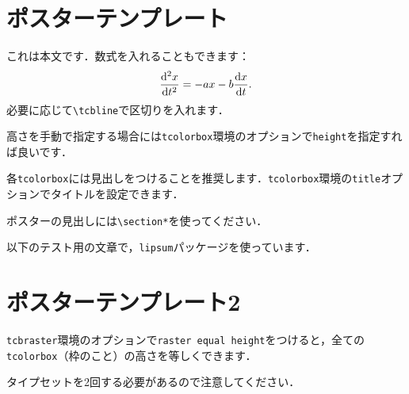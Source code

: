 \documentclass[12pt, a4j, dvipdfmx, jis2004]{jsarticle}
\begin{document}
\sffamily\gtfamily
\newpage
\section*{ポスターテンプレート}
\begin{tcbraster}[raster columns = 1]
	\begin{tcolorbox}[title = 本文・\texttt{\textbackslash tcbline}]
	これは本文です．数式を入れることもできます：
		\begin{equation}
		\dv[2]{x}{t}
		=-ax-b\dv{x}{t}.
		\end{equation}
	\tcbline
	必要に応じて\texttt{\textbackslash tcbline}で区切りを入れます．
	\end{tcolorbox}
	\begin{tcolorbox}[title = 高さ , height = 30mm]
	高さを手動で指定する場合には\texttt{tcolorbox}環境のオプションで\texttt{height}を指定すれば良いです．
	\end{tcolorbox}
	\begin{tcolorbox}[title = タイトルの指定]
	各\texttt{tcolorbox}には見出しをつけることを推奨します．\texttt{tcolorbox}環境の\texttt{title}オプションでタイトルを設定できます．
	\end{tcolorbox}
	\begin{tcolorbox}[title = ポスター見出し]
	ポスターの見出しには\texttt{\textbackslash section*}を使ってください．
	\end{tcolorbox}
	\begin{tcolorbox}[title = lipsum1]
	以下のテスト用の文章で，\texttt{lipsum}パッケージを使っています．
	\tcbline
	\lipsum[1]
	\end{tcolorbox}
\end{tcbraster}
\newpage
\section*{ポスターテンプレート2}
\begin{tcbraster}[raster columns = 1, raster equal height]
	\begin{tcolorbox}[title = \texttt{raster equal height}]
	\texttt{tcbraster}環境のオプションで\texttt{raster equal height}をつけると，全ての\texttt{tcolorbox}（枠のこと）の高さを等しくできます．
	
	タイプセットを2回する必要があるので注意してください．
	\end{tcolorbox}
	\begin{tcolorbox}[title = lipsum2]
	\lipsum[2]
	\end{tcolorbox}
	\begin{tcolorbox}[title = lipsum3]
	\lipsum[3]
	\end{tcolorbox}
\end{tcbraster}
\end{document}

